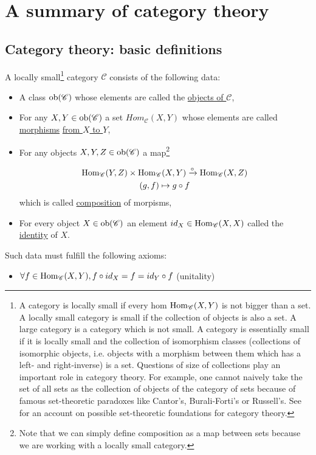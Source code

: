 \chapter{A summary of category theory}
\section{Category theory: basic definitions} %
\label{sub:cathegory_theory_language}

\begin{defn}
\label{Cat}
    A locally small\footnote{A category is locally small if every hom $\operatorname{Hom}_{\mathscr{C}}(X,Y)$ is not bigger than a set. A locally small category is small if the collection of objects is also a set. A large category is a category which is not small. A category is essentially small if it is locally small and the collection of isomorphism classes (collections of isomorphic objects, i.e. objects with a morphism between them which has a left- and right-inverse) is a set. Questions of size of collections play an important role in category theory. For example, one cannot naively take the set of all sets as the collection of objects of the category of sets because of famous set-theoretic paradoxes like Cantor's, Burali-Forti's or Russell's. See \cite{shulman2008set} for an account on possible set-theoretic foundations for category theory.} category $\mathscr{C}$ consists of the following data:
    \begin{itemize}
        \item A class $\operatorname{ob}(\mathscr{C})$ whose elements are called the \underline{objects of $\mathscr{C}$},
        \item For any $X, Y \in \operatorname{ob}(\mathscr{C})$ a set $Hom_{\mathscr{C}}(X,Y)$ whose elements are called \underline{morphisms} \underline{from $X$ to $Y$},
        \item For any objects $X,Y,Z\in \operatorname{ob}(\mathscr{C})$ a map\footnote{Note that we can simply define composition as a map between sets because we are working with a locally small category.}
        
        \begin{gather*}
            \operatorname{Hom}_{\mathscr{C}}(Y,Z)\times \operatorname{Hom}_{\mathscr{C}}(X,Y)\xrightarrow{\circ} \operatorname{Hom}_{\mathscr{C}}(X,Z) \\
            (g,f)\mapsto g\circ f
        \end{gather*}
        which is called \underline{composition} of morpisms,
        \item For every object $X\in \operatorname{ob}(\mathscr{C})$ an element $id_{X}\in \operatorname{Hom}_{\mathscr{C}}(X,X)$ called the \underline{identity} of $X$.
    \end{itemize}
    Such data must fulfill the following axioms: \begin{itemize}
        \item $\forall f\in \operatorname{Hom}_{\mathscr{C}}(X,Y), f\circ id_{X}=f=id_{Y}\circ f$ \hfill (unitality)
        

\end{itemize}
\end{defn}
